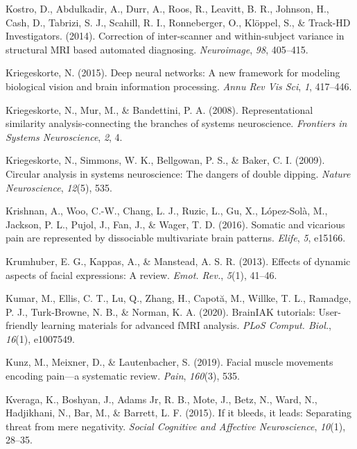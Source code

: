 \documentclass[12pt,american,a4paper,oneside,]{memoir} %
\begin{document}
\leavevmode\hypertarget{ref-Kostro2014-cm}{}%
Kostro, D., Abdulkadir, A., Durr, A., Roos, R., Leavitt, B. R., Johnson, H., Cash, D., Tabrizi, S. J., Scahill, R. I., Ronneberger, O., Klöppel, S., \& Track-HD Investigators. (2014). Correction of inter-scanner and within-subject variance in structural MRI based automated diagnosing. \emph{Neuroimage}, \emph{98}, 405--415.

\leavevmode\hypertarget{ref-Kriegeskorte2015-qi}{}%
Kriegeskorte, N. (2015). Deep neural networks: A new framework for modeling biological vision and brain information processing. \emph{Annu Rev Vis Sci}, \emph{1}, 417--446.

\leavevmode\hypertarget{ref-kriegeskorte2008representational}{}%
Kriegeskorte, N., Mur, M., \& Bandettini, P. A. (2008). Representational similarity analysis-connecting the branches of systems neuroscience. \emph{Frontiers in Systems Neuroscience}, \emph{2}, 4.

\leavevmode\hypertarget{ref-kriegeskorte2009circular}{}%
Kriegeskorte, N., Simmons, W. K., Bellgowan, P. S., \& Baker, C. I. (2009). Circular analysis in systems neuroscience: The dangers of double dipping. \emph{Nature Neuroscience}, \emph{12}(5), 535.

\leavevmode\hypertarget{ref-krishnan2016somatic}{}%
Krishnan, A., Woo, C.-W., Chang, L. J., Ruzic, L., Gu, X., López-Solà, M., Jackson, P. L., Pujol, J., Fan, J., \& Wager, T. D. (2016). Somatic and vicarious pain are represented by dissociable multivariate brain patterns. \emph{Elife}, \emph{5}, e15166.

\leavevmode\hypertarget{ref-Krumhuber2013-qi}{}%
Krumhuber, E. G., Kappas, A., \& Manstead, A. S. R. (2013). Effects of dynamic aspects of facial expressions: A review. \emph{Emot. Rev.}, \emph{5}(1), 41--46.

\leavevmode\hypertarget{ref-Kumar2020-eo}{}%
Kumar, M., Ellis, C. T., Lu, Q., Zhang, H., Capotă, M., Willke, T. L., Ramadge, P. J., Turk-Browne, N. B., \& Norman, K. A. (2020). BrainIAK tutorials: User-friendly learning materials for advanced fMRI analysis. \emph{PLoS Comput. Biol.}, \emph{16}(1), e1007549.

\leavevmode\hypertarget{ref-Kunz2019-uh}{}%
Kunz, M., Meixner, D., \& Lautenbacher, S. (2019). Facial muscle movements encoding pain---a systematic review. \emph{Pain}, \emph{160}(3), 535.

\leavevmode\hypertarget{ref-kveraga2015if}{}%
Kveraga, K., Boshyan, J., Adams Jr, R. B., Mote, J., Betz, N., Ward, N., Hadjikhani, N., Bar, M., \& Barrett, L. F. (2015). If it bleeds, it leads: Separating threat from mere negativity. \emph{Social Cognitive and Affective Neuroscience}, \emph{10}(1), 28--35.
\end{document}
